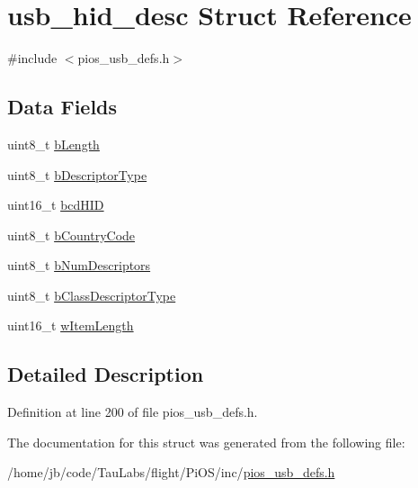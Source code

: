 \hypertarget{structusb__hid__desc}{\section{usb\-\_\-hid\-\_\-desc \-Struct \-Reference}
\label{structusb__hid__desc}
}


{\ttfamily \#include $<$pios\-\_\-usb\-\_\-defs.\-h$>$}

\subsection*{\-Data \-Fields}
\begin{DoxyCompactItemize}
\item 
uint8\-\_\-t \hyperlink{group___p_i_o_s___u_s_b___d_e_f_s_ga738612f01d93af966dfd2e9fbf29e409}{b\-Length}
\item 
uint8\-\_\-t \hyperlink{group___p_i_o_s___u_s_b___d_e_f_s_ga6fd7eaaf97d6f887fb38056456f79038}{b\-Descriptor\-Type}
\item 
uint16\-\_\-t \hyperlink{group___p_i_o_s___u_s_b___d_e_f_s_gab7e8d21f875c12e9ed7715a78fe5bb9e}{bcd\-H\-I\-D}
\item 
uint8\-\_\-t \hyperlink{group___p_i_o_s___u_s_b___d_e_f_s_gadbef4d9e2e13fd696fcf8339ee1a27b3}{b\-Country\-Code}
\item 
uint8\-\_\-t \hyperlink{group___p_i_o_s___u_s_b___d_e_f_s_ga5bce1598e0b04efe977788e2027fde3a}{b\-Num\-Descriptors}
\item 
uint8\-\_\-t \hyperlink{group___p_i_o_s___u_s_b___d_e_f_s_ga25fe14740813f95e5163aeb719b36d35}{b\-Class\-Descriptor\-Type}
\item 
uint16\-\_\-t \hyperlink{group___p_i_o_s___u_s_b___d_e_f_s_ga86359b23d6a148a291cb15cab529444b}{w\-Item\-Length}
\end{DoxyCompactItemize}


\subsection{\-Detailed \-Description}


\-Definition at line 200 of file pios\-\_\-usb\-\_\-defs.\-h.



\-The documentation for this struct was generated from the following file\-:\begin{DoxyCompactItemize}
\item 
/home/jb/code/\-Tau\-Labs/flight/\-Pi\-O\-S/inc/\hyperlink{pios__usb__defs_8h}{pios\-\_\-usb\-\_\-defs.\-h}\end{DoxyCompactItemize}
